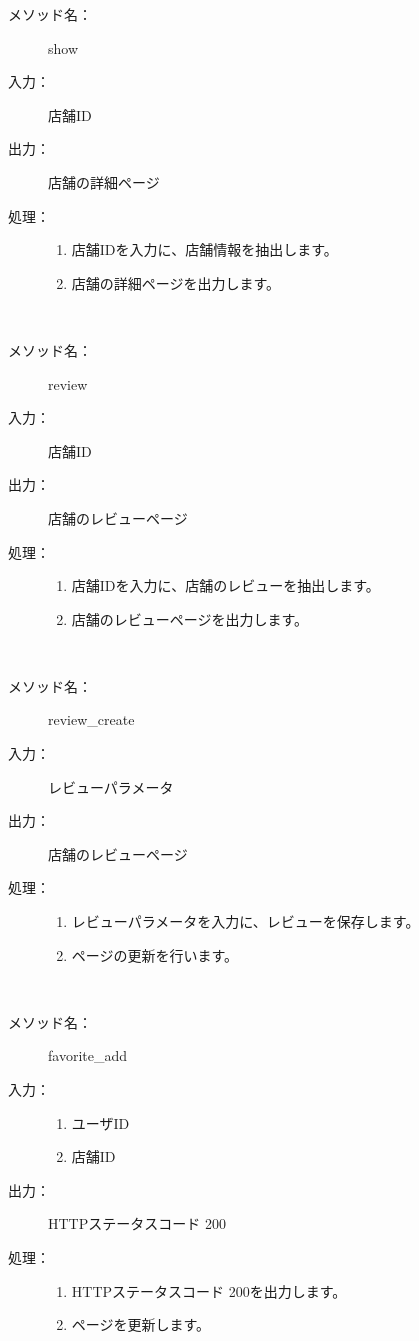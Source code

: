 \documentclass[a4j,titlepage]{jarticle}
\begin{document}
\begin{description}
\item [メソッド名：] show
\item [入力：] 店舗ID
\item [出力：] 店舗の詳細ページ
\item [処理：]\mbox{}
  \begin{enumerate}
  \item 店舗IDを入力に、店舗情報を抽出します。
  \item 店舗の詳細ページを出力します。
  \end{enumerate}
\end{description}
​
\begin{description}
\item [メソッド名：] review
\item [入力：] 店舗ID
\item [出力：] 店舗のレビューページ
\item [処理：]\mbox{}
  \begin{enumerate}
  \item 店舗IDを入力に、店舗のレビューを抽出します。
  \item 店舗のレビューページを出力します。
  \end{enumerate}
\end{description}
​
\begin{description}
\item [メソッド名：] review\_create
\item [入力：] レビューパラメータ
\item [出力：] 店舗のレビューページ
\item [処理：]\mbox{}
  \begin{enumerate}
  \item レビューパラメータを入力に、レビューを保存します。
  \item ページの更新を行います。
  \end{enumerate}
\end{description}
​
\begin{description}
\item [メソッド名：] favorite\_add
\item [入力：]
  \begin{enumerate}
    \item ユーザID
    \item 店舗ID
  \end{enumerate}
\item [出力：] HTTPステータスコード 200
\item [処理：] \mbox{}
  \begin{enumerate}
  \item HTTPステータスコード 200を出力します。
  \item ページを更新します。
　\end{enumerate}
\end{description}
\end{document}
